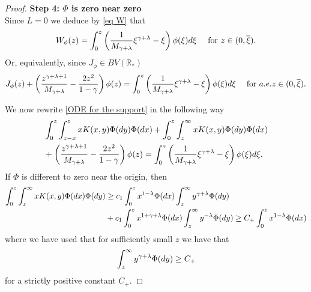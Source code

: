 \documentclass[11pt]{article}
\numberwithin{equation}{section}
\theoremstyle{plain}
\newcommand{\der}{\textup{d}}
\begin{document}
\begin{proof}
\textbf{Step 4: $\Phi$ is zero near zero}\\

Since $L=0$ we deduce by \eqref{eq W} that 
\begin{align} \label{eq W2} 
 W_\phi (z)  = \int_0^z  \left( \frac{1}{M_{\gamma +\lambda} } \xi^{\gamma + \lambda} - \xi \right) \phi(\xi) \der \xi \quad 
 \text{ for } z \in(0, \overline \xi).
\end{align} 
Or, equivalently, since $J_\phi \in BV(\mathbb R_*)$
\begin{align} \label{ODE for the support}
J_\phi (z) + \left( \frac{z^{\gamma + \lambda +1} }{M_{\gamma + \lambda} }- \frac{2 z^2 }{1-\gamma }\right) \phi(z) = \int_0^z  \left( \frac{1}{M_{\gamma +\lambda} } \xi^{\gamma + \lambda} - \xi \right) \phi(\xi) \der \xi \quad 
 \text{ for } a.e. z \in (0, \overline \xi).
\end{align} 

We now rewrite \eqref{ODE for the support} in the following way
\begin{align*} 
&\int_0^z \int_{z-x}^z x K(x,y) \Phi(\der y) \Phi( \der x)  + \int_0^z \int_z^\infty x K(x,y) \Phi(\der y) \Phi(\der x)  \\
&+ \left( \frac{z^{\gamma + \lambda +1} }{M_{\gamma + \lambda} }- \frac{2 z^2 }{1-\gamma }\right) \phi(z) = \int_0^z  \left( \frac{1}{M_{\gamma +\lambda} } \xi^{\gamma + \lambda} - \xi \right) \phi(\xi) \der \xi.
\end{align*} 
If $\Phi$ is different to zero near the origin, then
  \begin{align*}\int_0^z \int_z^\infty x K(x,y)  \Phi( \der x) \Phi(\der y ) & \geq c_1 \int_0^z x^{1-\lambda}  \Phi( \der x) \int_z^\infty y^{\gamma+\lambda}  \Phi( \der y) \\
  &+ c_1 \int_0^z x^{1+\gamma+\lambda}  \Phi(\der x)   \int_z^\infty y^{-\lambda}  \Phi(\der y ) \geq C_+ \int_0^z x^{1-\lambda} \Phi( \der x)
  \end{align*} 
where we have used that for sufficiently small $z$ we have that
\[
\int_z^\infty y^{\gamma+\lambda}  \Phi(\der y)  \geq  C_+
\] 
for a strictly positive constant $C_+$. 


\end{proof}
\end{document}

